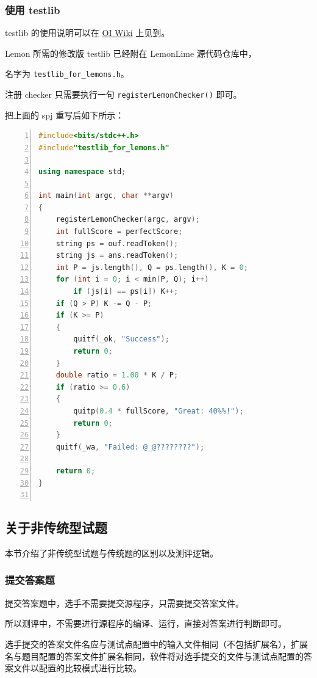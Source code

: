 \documentclass[UTF-8]{ctexart}
\begin{document}
			\subsubsection{使用 testlib}
			
				testlib 的使用说明可以在 \href{https://oi-wiki.org/intro/testlib/}{OI Wiki} 上见到。
				
				Lemon 所需的修改版 testlib 已经附在 LemonLime 源代码仓库中，
				
				名字为 \texttt{testlib\_for\_lemons.h}。
				
				注册 checker 只需要执行一句 \texttt{registerLemonChecker()} 即可。
				
				把上面的 spj 重写后如下所示：
		
				\begin{lstlisting}[language={C++},numbers=left,showspaces=false,showstringspaces=false,frame=shadowbox,basicstyle=\ttfamily]
#include<bits/stdc++.h>
#include"testlib_for_lemons.h"

using namespace std;

int main(int argc, char **argv)
{
	registerLemonChecker(argc, argv);
	int fullScore = perfectScore;
	string ps = ouf.readToken();
	string js = ans.readToken();
	int P = js.length(), Q = ps.length(), K = 0;
	for (int i = 0; i < min(P, Q); i++)
		if (js[i] == ps[i]) K++;
	if (Q > P) K -= Q - P;
	if (K >= P)
	{
		quitf(_ok, "Success");
		return 0;
	}
	double ratio = 1.00 * K / P;
	if (ratio >= 0.6)
	{
		quitp(0.4 * fullScore, "Great: 40%%!");
		return 0;
	}
	quitf(_wa, "Failed: @_@????????");
	
	return 0;
}
		
				\end{lstlisting}
				
				
		\subsection{关于非传统型试题}
				
			本节介绍了非传统型试题与传统题的区别以及测评逻辑。
				
			\subsubsection{提交答案题}
				
				提交答案题中，选手不需要提交源程序，只需要提交答案文件。
				
				所以测评中，不需要进行源程序的编译、运行，直接对答案进行判断即可。
				
				选手提交的答案文件名应与测试点配置中的输入文件相同（不包括扩展名），扩展名与题目配置的答案文件扩展名相同，软件将对选手提交的文件与测试点配置的答案文件以配置的比较模式进行比较。
				
\end{document}
